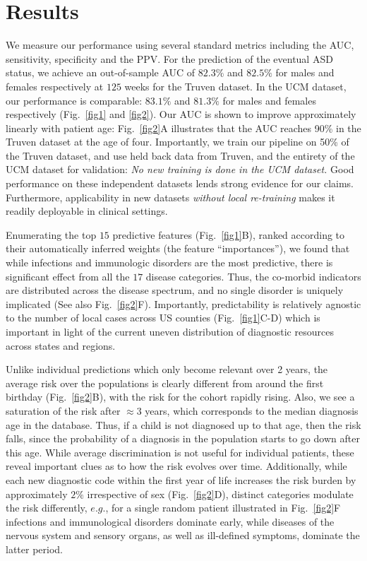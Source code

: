 \documentclass[3p,super,numbers,sort&compress,10pt]{elsarticle}
\begin{document}

\section*{Results}
We measure our performance using several standard metrics including the AUC, sensitivity, specificity and the PPV. For the prediction of the eventual ASD  status, we achieve an out-of-sample AUC of $82.3\%$ and  $82.5\%$ for males and females respectively at $125$ weeks for the Truven dataset. In the UCM dataset, our performance is comparable: $83.1\%$ and $81.3\%$ for males and females respectively (Fig.~\ref{fig1} and \ref{fig2}).  Our AUC is shown to improve approximately  linearly  with patient age: Fig.~\ref{fig2}A illustrates that the  AUC  reaches 90\%  in the Truven dataset at the age of four. Importantly, we train  our  pipeline on 50\% of the Truven dataset, and use held back data from Truven, and the entirety of the UCM dataset for validation: \textit{No new training is done in the UCM dataset.} Good  performance on these independent datasets lends strong evidence for our claims. Furthermore, applicability in new datasets \textit{without local re-training} makes it readily  deployable in clinical settings.

Enumerating the top $15$ predictive features (Fig.~\ref{fig1}B), ranked  according to their automatically inferred weights  (the feature ``importances''), we found that while infections and immunologic disorders are the most predictive, there is significant effect from all the $17$ disease categories. Thus, the  co-morbid indicators are  distributed across the disease spectrum, and no single  disorder is uniquely implicated (See also Fig.~\ref{fig2}F). Importantly, predictability is relatively agnostic to the number of local cases across US counties (Fig.~\ref{fig1}C-D) which is important in light of the current uneven distribution of  diagnostic resources~\cite{gordon2016whittling,althouse2006pediatric} across states and regions.
 
Unlike individual predictions which only become relevant over 2 years, the average risk over the populations is clearly different  from around the  first birthday (Fig.~\ref{fig2}B), with the risk for the  \treatment cohort rapidly rising. Also, we see a saturation of the risk after $\approx 3$ years, which corresponds to the median diagnosis age in the database. Thus, if a child is not diagnosed up to that age, then the  risk  falls, since the probability of a diagnosis in the population starts to go down after this age. While average discrimination is not useful for individual patients, these reveal important clues as to how the  risk evolves over time. Additionally, while  each  new diagnostic code within the first year of life  increases the risk burden by approximately $2\%$ irrespective of sex (Fig.~\ref{fig2}D), distinct  categories modulate the risk differently, $e.g.$, for a single random patient  illustrated in Fig.~\ref{fig2}F infections and immunological disorders dominate early, while  diseases of the nervous system and sensory organs, as well as ill-defined symptoms,  dominate the latter period.
\end{document}
